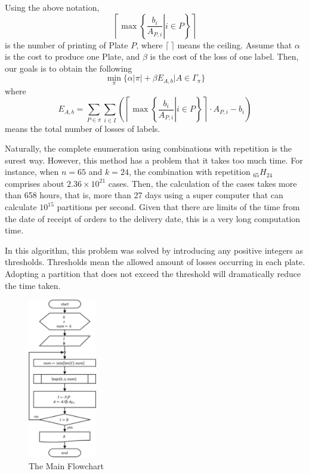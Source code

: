 \documentclass[review]{elsarticle}
\begin{document}
Using the above notation,
\begin{equation}\label{eq:NumPlate}
\left\lceil \max \left\{ \left.\frac{b_{i}}{A_{P,i}}\right|i \in P \right\} \right\rceil
\end{equation}
is the number of printing of Plate $P$, where $\lceil~\rceil$ means the ceiling. 
Assume that $\alpha$ is the cost to produce one Plate, and $\beta$ is the cost of the loss of one label. 
Then, our goals is to obtain the following 
\begin{equation}\label{eq:TotalCost}
\min_{\pi} \{ \alpha|\pi| + \beta E_{A,b} | A \in \Gamma_{\pi} \}
\end{equation}
where
\begin{equation}\label{eq:TotalLoss}
E_{A,b} = \sum_{P \in \pi} \sum_{i \in I} \left( \left\lceil \max \left\{ \left.\frac{b_{i}}{A_{P,i}}\right|i \in P \right\} \right\rceil \cdot A_{P,i} - b_{i} \right)
\end{equation}
means the total number of losses of labels.

Naturally, the complete enumeration using combinations with repetition is the surest way. 
However, this method has a problem that it takes too much time. 
For instance, when $n=65$ and $k = 24$, the combination with repetition $_{65}H_{24}$ comprises about $2.36 \times 10^{21}$ cases.
Then, the calculation of the cases takes more than 658 hours, that is, more than 27 days using a super computer that can calculate $10^{15}$ partitions per second. 
Given that there are limits of the time from the date of receipt of orders to the delivery date, this is a very long computation time.

In this algorithm, this problem was solved by introducing any positive integers as thresholds. 
Thresholds mean the allowed amount of losses occurring in each plate. 
Adopting a partition that does not exceed the threshold will dramatically reduce the time taken.

\begin{figure}[h!]
	\centering
	\includegraphics[width=3cm]{MainFChart.pdf}
	\caption{The Main Flowchart}
	\label{fig:MFChart}       %
\end{figure}
\end{document}
